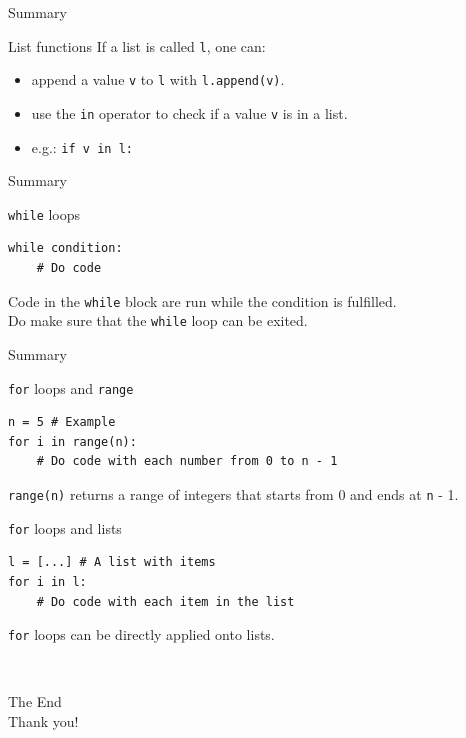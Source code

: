 \documentclass[dvipsnames, svgnames, x11names, handout]{beamer}
\begin{document}
\begin{frame}[fragile]{Summary}
\begin{block}{List functions}
If a list is called \texttt{l}, one can:
\begin{itemize}
    \item append a value \texttt{v} to \texttt{l} with \texttt{l.append(v)}.
    \item use the \texttt{in} operator to check if a value \texttt{v} is in a list.
    \item[] e.g.: \texttt{if v in l:}
\end{itemize}
\end{block}
\end{frame}

\begin{frame}[fragile]{Summary}
\begin{block}{\texttt{while} loops}
\begin{verbatim}
while condition:
    # Do code
\end{verbatim}
Code in the \texttt{while} block are run while the condition is fulfilled.\\
Do make sure that the \texttt{while} loop can be exited.
\end{block}
\end{frame}

\begin{frame}[fragile]{Summary}
\begin{block}{\texttt{for} loops and \texttt{range}}
\begin{verbatim}
n = 5 # Example
for i in range(n):
    # Do code with each number from 0 to n - 1
\end{verbatim}
\texttt{range(n)} returns a range of integers that starts from 0 and ends at \texttt{n} - 1.
\end{block}

\begin{block}{\texttt{for} loops and lists}
\begin{verbatim}
l = [...] # A list with items
for i in l:
    # Do code with each item in the list
\end{verbatim}
\texttt{for} loops can be directly applied onto lists.
\end{block}
\end{frame}

\begin{frame}{ \ }
	\begin{center}
		The End\\
		Thank you!
	\end{center}
\end{frame}
\end{document}
